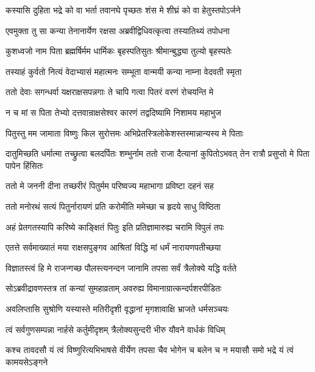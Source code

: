 \twolineshloka
{कस्यासि दुहिता भद्रे को वा भर्ता तवानघे}
{पृच्छतः शंस मे शीघ्रं को वा हेतुस्तपोऽर्जने} %

\twolineshloka
{एवमुक्ता तु सा कन्या तेनानार्येण रक्षसा}
{अब्रवीद्विधिवत्कृत्वा तस्यातिथ्यं तपोधना} %

\twolineshloka
{कुशध्वजो नाम पिता ब्रह्मर्षिर्मम धार्मिकः}
{बृहस्पतिसुतः श्रीमान्बुद्ध्या तुल्यो बृहस्पतेः} %

\twolineshloka
{तस्याहं कुर्वतो नित्यं वेदाभ्यासं महात्मनः}
{सम्भूता वान्मयी कन्या नाम्ना वेदवती स्मृता} %

\twolineshloka
{ततो देवाः सगन्धर्वा यक्षराक्षसपन्नगाः}
{ते चापि गत्वा पितरं वरणं रोचयन्ति मे} %

\twolineshloka
{न च मां स पिता तेभ्यो दत्तवान्राक्षसेश्वर}
{कारणं तद्वदिष्यामि निशामय महाभुज} %

\twolineshloka
{पितुस्तु मम जामाता विष्णुः किल सुरोत्तमः}
{अभिप्रेतस्त्रिलोकेशस्तस्मान्नान्यस्य मे पिताः} %

\threelineshloka
{दातुमिच्छति धर्मात्मा तच्छ्रुत्वा बलदर्पितः}
{शम्भुर्नाम ततो राजा दैत्यानां कुपितोऽभवत्}
{तेन रात्रौ प्रसुप्तो मे पिता पापेन हिंसितः} %

\twolineshloka
{ततो मे जननी दीना तच्छरीरं पितुर्मम}
{परिष्वज्य महाभागा प्रविष्टा दहनं सह} %

\twolineshloka
{ततो मनोरथं सत्यं पितुर्नारायणं प्रति}
{करोमीति ममेच्छा च हृदये साधु विष्ठिता} %

\twolineshloka
{अहं प्रेतगतस्यापि करिष्ये काङ्क्षितं पितुः}
{इति प्रतिज्ञामारुह्य चरामि विपुलं तपः} %

\twolineshloka
{एतत्ते सर्वमाख्यातं मया राक्षसपुङ्गव}
{आश्रितां विद्धि मां धर्मं नारायणपतीच्छया} %

\twolineshloka
{विज्ञातस्त्वं हि मे राजन्गच्छ पौलस्त्यनन्दन}
{जानामि तपसा सर्वं त्रैलोक्ये यद्धि वर्तते} %

\twolineshloka
{सोऽब्रवीद्रावणस्तत्र तां कन्यां सुमहाव्रताम्}
{अवरुह्य विमानाग्रात्कन्दर्पशरपीडितः} %

\twolineshloka
{अवलिप्तासि सुश्रोणि यस्यास्ते मतिरीदृशी}
{वृद्धानां मृगशावाक्षि भ्राजते धर्मसञ्चयः} %

\twolineshloka
{त्वं सर्वगुणसम्पन्ना नार्हसे कर्तुमीदृशम्}
{त्रैलोक्यसुन्दरी भीरु यौवने वार्धकं विधिम्} %

\threelineshloka
{कश्च तावदसौ यं त्वं विष्णुरित्यभिभाषसे}
{वीर्येण तपसा चैव भोगेन च बलेन च}
{न मयासौ समो भद्रे यं त्वं कामयसेऽङ्गने} %

